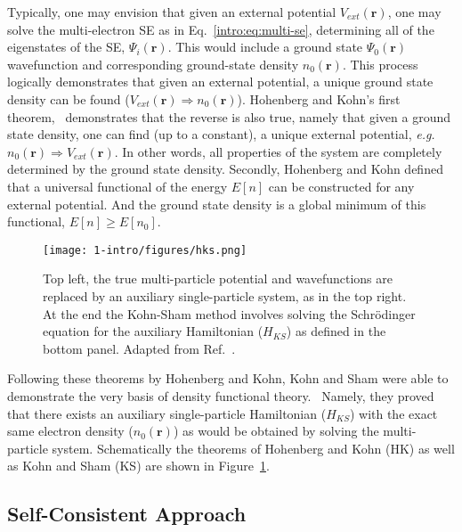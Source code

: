 Typically, one may envision that given an external potential $V_{ext}(\textbf{r})$, one may solve the multi-electron SE as in Eq.~\ref{intro:eq:multi-se}, determining all of the eigenstates of the SE, $\Psi_i({\textbf{r}})$. This would include a ground state $\Psi_0({\textbf{r}})$ wavefunction and corresponding ground-state density $n_0(\textbf{r})$. This process logically demonstrates that given an external potential, a unique ground state density can be found ($V_{ext}(\textbf{r})\Rightarrow n_0(\textbf{r})$). Hohenberg and Kohn's first theorem,~\cite{hohenberg1964inhomogeneous} demonstrates that the reverse is also true, namely that given a ground state density, one can find (up to a constant), a unique external potential, \textit{e.g.}\ $n_0(\textbf{r}) \Rightarrow V_{ext}(\textbf{r})$. In other words, all properties of the system are completely determined by the ground state density. Secondly, Hohenberg and Kohn defined that a universal functional of the energy $E[n]$ can be constructed for any external potential. And the ground state density is a global minimum of this functional, $E[n]\geq E[n_0]$.


\begin{figure}[h]
\begin{center}
\texttt{[image: 1-intro/figures/hks.png]}
    \caption{Top left, the true multi-particle potential and wavefunctions are replaced by an auxiliary single-particle system, as in the top right. At the end the Kohn-Sham method involves solving the Schr{\"o}dinger equation for the auxiliary Hamiltonian ($H_{KS}$) as defined in the bottom panel. Adapted from Ref.~\cite{martin2020electronic}.}  \label{intro:fig:hks}
\end{center}
\end{figure}

Following these theorems by Hohenberg and Kohn, Kohn and Sham were able to demonstrate the very basis of density functional theory.~\cite{kohn1965self} Namely, they proved that there exists an auxiliary single-particle Hamiltonian ($H_{KS}$) with the exact same electron density ($n_0(\textbf{r})$) as would be obtained by solving the multi-particle system. Schematically the theorems of Hohenberg and Kohn (HK) as well as Kohn and Sham (KS) are shown in Figure~\ref{intro:fig:hks}.

\subsection{Self-Consistent Approach}

